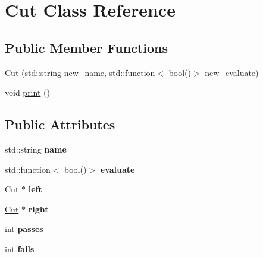 \hypertarget{classCut}{}\section{Cut Class Reference}
\label{classCut}
\subsection*{Public Member Functions}
\begin{DoxyCompactItemize}
\item 
\hyperlink{classCut_aaa89435c5326080296041bc38937ab2d}{Cut} (std\+::string new\+\_\+name, std\+::function$<$ bool()$>$ new\+\_\+evaluate)
\item 
void \hyperlink{classCut_a9b1298219ed1f85bba920e4049d712e3}{print} ()
\end{DoxyCompactItemize}
\subsection*{Public Attributes}
\begin{DoxyCompactItemize}
\item 
std\+::string {\bfseries name}\hypertarget{classCut_accf700d2d00746b97a265d4aea3f55c2}{}\label{classCut_accf700d2d00746b97a265d4aea3f55c2}

\item 
std\+::function$<$ bool()$>$ {\bfseries evaluate}\hypertarget{classCut_a4205ad5e62b859536797141f3ace2253}{}\label{classCut_a4205ad5e62b859536797141f3ace2253}

\item 
\hyperlink{classCut}{Cut} $\ast$ {\bfseries left}\hypertarget{classCut_a2c65e372172dfa0f705d117d3ad0f668}{}\label{classCut_a2c65e372172dfa0f705d117d3ad0f668}

\item 
\hyperlink{classCut}{Cut} $\ast$ {\bfseries right}\hypertarget{classCut_a2142ffe68028bb0c211408c0f5bb8bfb}{}\label{classCut_a2142ffe68028bb0c211408c0f5bb8bfb}

\item 
int {\bfseries passes}\hypertarget{classCut_a9ec802667c770787a473c622208ef35c}{}\label{classCut_a9ec802667c770787a473c622208ef35c}

\item 
int {\bfseries fails}\hypertarget{classCut_a7bfcec46b8c2879a9660ac7656ed7b83}{}\label{classCut_a7bfcec46b8c2879a9660ac7656ed7b83}

\end{DoxyCompactItemize}


